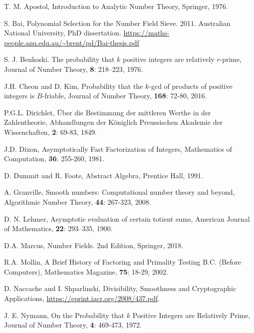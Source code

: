 \documentclass[12pt]{amsart}
\theoremstyle{definition}
\begin{document}
\begin{thebibliography}{1}

 T. M. Apostol, Introduction to Analytic Number Theory, Springer, 1976.

 S. Bai, Polynomial Selection for the Number Field Sieve. 2011. Australian National University, PhD dissertation. \url{https://maths-people.anu.edu.au/~brent/pd/Bai-thesis.pdf} %

 S. J. Benkoski. The probability that $k$ positive integers are relatively $r$-prime, Journal of Number Theory, \textbf{8}: 218–223, 1976.

 J.H. Cheon and D. Kim, Probability that the $k$-gcd of products of positive integers is $B$-friable, Journal of Number Theory, \textbf{168}: 72-80, 2016.

 P.G.L. Dirichlet, \"{U}ber die Bestimmung der mittleren Werthe in der Zahlentheorie, Abhandlungen der K\"{o}niglich Preussischen Akademie der Wissenchaften, \textbf{2}: 69-83, 1849.

 J.D. Dixon, Asymptotically Fast Factorization of Integers, Mathematics of Computation, \textbf{36}: 255-260, 1981.

 D. Dummit and R. Foote, Abstract Algebra, Prentice Hall, 1991.

 A. Granville, Smooth numbers: Computational number theory and beyond, Algorithmic Number Theory, \textbf{44}: 267-323, 2008.

 D. N. Lehmer, Asymptotic evaluation of certain totient sums, American Journal of Mathematics, \textbf{22}: 293–335, 1900.

 D.A. Marcus, Number Fields. 2nd Edition, Springer, 2018. %

 R.A. Mollin, A Brief History of Factoring and Primality Testing B.C. (Before Computers), Mathematics Magazine, \textbf{75}: 18-29, 2002.

 D. Naccache and I. Shparlinski, Divisibility, Smoothness and Cryptographic Applications,
\url{https://eprint.iacr.org/2008/437.pdf}. %

 J. E. Nymann, On the Probability that $k$ Positive Integers are Relatively Prime, Journal of Number Theory, \textbf{4}: 469-473, 1972.


\end{thebibliography}
\end{document}
